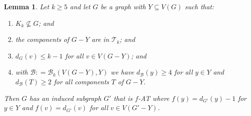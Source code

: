\documentclass[10pt]{article}
\theoremstyle{plain}
\newtheorem{lem}[thm]{Lemma}
\theoremstyle{definition}
\theoremstyle{remark}
\newcommand{\fancy}[1]{\mathcal{#1}}
\newcommand{\T}{\fancy{T}}
\newcommand{\B}{\fancy{B}}
\newcommand{\DefinedAs}{\mathrel{\mathop:}=}
\begin{document}
\begin{lem}
	\label{MultipleHighConfigurationEulerLopsided} Let $k \ge 5$ and let $G$ be a graph with
	$Y\subseteq V(G)$ such that: 
	\begin{enumerate}
		\item $K_{k}\not\subseteq G$; and 
		\item the components of $G-Y$ are in $\T_{k}$; and 
		\item $d_{G}(v)\leq k-1$ for all $v\in V(G-Y)$; and 
		\item with $\B \DefinedAs \B_k(V(G-Y), Y)$ we have $d_{\B}(y) \ge 4$ for all $y \in Y$ and $d_{\B}(T) \ge 2$ for all components $T$ of $G-Y$.
	\end{enumerate}
	\noindent Then $G$ has an induced subgraph $G'$ that is $f$-AT where $f(y)=d_{G'}(y)-1$
	for $y\in Y$ and $f(v)=d_{G'}(v)$ for all $v\in V(G'-Y)$.
\end{lem}
\end{document}
